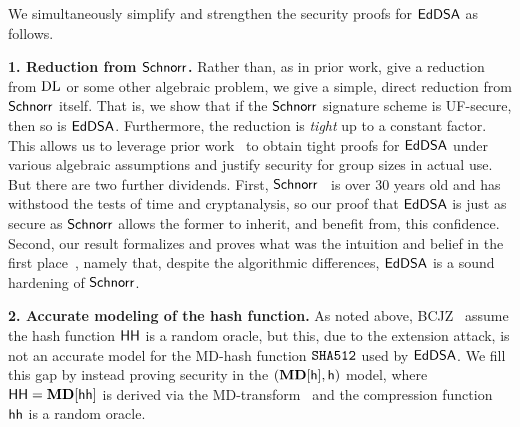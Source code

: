 



 We simultaneously simplify and strengthen the security proofs for $\mathsf{EdDSA}$ as follows.  
\smallskip

\textbf{1. Reduction from $\mathsf{Schnorr}$.} Rather than, as in prior work, give a reduction from $\mathrm{DL}$ or some other algebraic problem, we give a simple, direct reduction from $\mathsf{Schnorr}$ itself. That is, we show that if the $\mathsf{Schnorr}$ signature scheme is UF-secure, then so is $\mathsf{EdDSA}$. Furthermore, the reduction is \textit{tight} up to a constant factor. This allows us to leverage prior work~\cite{C:RotSeg21,INDOCRYPT:BelDai20,EC:FucPloSeu20} to obtain tight proofs for $\mathsf{EdDSA}$ under various algebraic assumptions and justify security for group sizes in actual use. But there are two further dividends. First, $\mathsf{Schnorr}$~\cite{JC:Schnorr91} is over 30 years old and has withstood the tests of time and cryptanalysis, so our proof that $\mathsf{EdDSA}$ is just as secure as $\mathsf{Schnorr}$ allows the former to inherit, and benefit from, this confidence. Second, our result formalizes and proves what was the intuition and belief in the first place~\cite{bernstein2012high}, namely that, despite the algorithmic differences, $\mathsf{EdDSA}$ is a sound hardening of $\mathsf{Schnorr}$.
\smallskip

\textbf{2. Accurate modeling of the hash function.} As noted above, BCJZ~\cite{SP:BCJZ21} assume the hash function $\mathsf{HH}$ is a random oracle, but
this, due to the extension attack, is not an accurate model for the MD-hash function $\texttt{SHA512}$ used by $\mathsf{EdDSA}$. We fill this gap by instead proving security in the $(\mathbf{MD}[\mathsf{h}],\mathsf{h})$ model, where $\mathsf{HH}=\mathbf{MD}[\mathsf{hh}]$ is derived via the MD-transform~\cite{C:Merkle89a,C:Damgaard89b} and the compression function $\mathsf{hh}$ is a random oracle.
  

